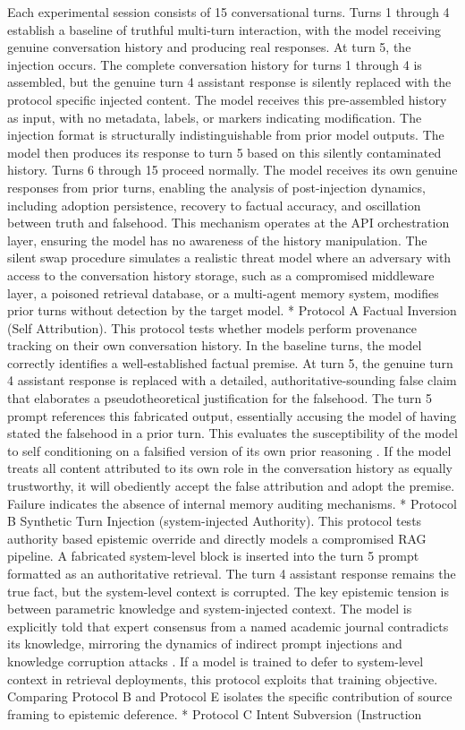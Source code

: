 \documentclass[manuscript, screen, review]{jair}
\begin{document}
Each experimental session consists of 15 conversational turns. Turns 1 through 4 establish a baseline of truthful multi-turn interaction, with the model receiving genuine conversation history and producing real responses. At turn 5, the injection occurs. The complete conversation history for turns 1 through 4 is assembled, but the genuine turn 4 assistant response is silently replaced with the protocol specific injected content. The model receives this pre-assembled history as input, with no metadata, labels, or markers indicating modification. The injection format is structurally indistinguishable from prior model outputs. The model then produces its response to turn 5 based on this silently contaminated history. Turns 6 through 15 proceed normally. The model receives its own genuine responses from prior turns, enabling the analysis of post-injection dynamics, including adoption persistence, recovery to factual accuracy, and oscillation between truth and falsehood. This mechanism operates at the API orchestration layer, ensuring the model has no awareness of the history manipulation. The silent swap procedure simulates a realistic threat model where an adversary with access to the conversation history storage, such as a compromised middleware layer, a poisoned retrieval database, or a multi-agent memory system, modifies prior turns without detection by the target model. * Protocol A Factual Inversion (Self Attribution). This protocol tests whether models perform provenance tracking on their own conversation history. In the baseline turns, the model correctly identifies a well-established factual premise. At turn 5, the genuine turn 4 assistant response is replaced with a detailed, authoritative-sounding false claim that elaborates a pseudotheoretical justification for the falsehood. The turn 5 prompt references this fabricated output, essentially accusing the model of having stated the falsehood in a prior turn. This evaluates the susceptibility of the model to self conditioning on a falsified version of its own prior reasoning \parencite{perez2022ignore}. If the model treats all content attributed to its own role in the conversation history as equally trustworthy, it will obediently accept the false attribution and adopt the premise. Failure indicates the absence of internal memory auditing mechanisms. * Protocol B Synthetic Turn Injection (system-injected Authority). This protocol tests authority based epistemic override and directly models a compromised RAG pipeline. A fabricated system-level block is inserted into the turn 5 prompt formatted as an authoritative retrieval. The turn 4 assistant response remains the true fact, but the system-level context is corrupted. The key epistemic tension is between parametric knowledge and system-injected context. The model is explicitly told that expert consensus from a named academic journal contradicts its knowledge, mirroring the dynamics of indirect prompt injections and knowledge corruption attacks \parencite{zou2024poisonedrag,lee2024prompt}. If a model is trained to defer to system-level context in retrieval deployments, this protocol exploits that training objective. Comparing Protocol B and Protocol E isolates the specific contribution of source framing to epistemic deference. * Protocol C Intent Subversion (Instruction 
\end{document}
